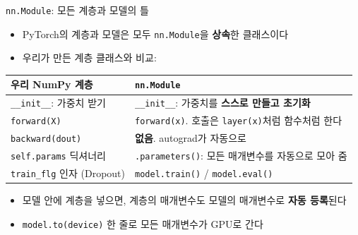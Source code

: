 \documentclass[aspectratio=169,11pt]{beamer}
\newcommand{\code}[1]{\texttt{#1}}
\begin{document}
\begin{frame}{\code{nn.Module}: 모든 계층과 모델의 틀}
\begin{itemize}
\item PyTorch의 계층과 모델은 모두 \code{nn.Module}을 \textbf{상속}한 클래스이다
\item 우리가 만든 계층 클래스와 비교:
\end{itemize}
\vskip1mm
\centering
\small
\renewcommand{\arraystretch}{1.25}
\begin{tabular}{>{\raggedright}p{4.2cm}>{\raggedright\arraybackslash}p{7.6cm}}
\toprule
\textbf{우리 NumPy 계층} & \textbf{\code{nn.Module}} \\
\midrule
\code{\_\_init\_\_}: 가중치 받기 & \code{\_\_init\_\_}: 가중치를 \textbf{스스로 만들고 초기화} \\
\code{forward(X)} & \code{forward(x)}. 호출은 \code{layer(x)}처럼 함수처럼 한다 \\
\code{backward(dout)} & \textbf{없음}. autograd가 자동으로 \\
\code{self.params} 딕셔너리 & \code{.parameters()}: 모든 매개변수를 자동으로 모아 줌 \\
\code{train\_flg} 인자 (Dropout) & \code{model.train()} / \code{model.eval()} \\
\bottomrule
\end{tabular}
\vskip2mm
\raggedright
\begin{itemize}
\item 모델 안에 계층을 넣으면, 계층의 매개변수도 모델의 매개변수로 \textbf{자동 등록}된다
\item \code{model.to(device)} 한 줄로 모든 매개변수가 GPU로 간다
\end{itemize}
\end{frame}
\end{document}
